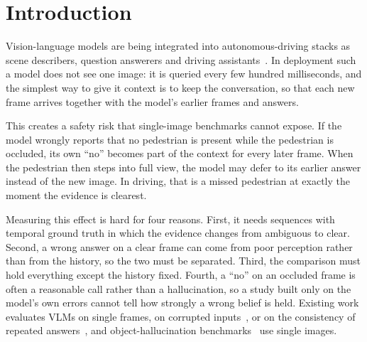 \documentclass[conference]{IEEEtran}
\begin{document}
\section{Introduction}

Vision-language models are being integrated into autonomous-driving stacks as scene describers, question answerers and driving assistants~\cite{guo2024vlmauto,xie2025drivebench,lin2025continual}. In deployment such a model does not see one image: it is queried every few hundred milliseconds, and the simplest way to give it context is to keep the conversation, so that each new frame arrives together with the model's earlier frames and answers.

This creates a safety risk that single-image benchmarks cannot expose. If the model wrongly reports that no pedestrian is present while the pedestrian is occluded, its own ``no'' becomes part of the context for every later frame. When the pedestrian then steps into full view, the model may defer to its earlier answer instead of the new image. In driving, that is a missed pedestrian at exactly the moment the evidence is clearest.

Measuring this effect is hard for four reasons. First, it needs sequences with temporal ground truth in which the evidence changes from ambiguous to clear. Second, a wrong answer on a clear frame can come from poor perception rather than from the history, so the two must be separated. Third, the comparison must hold everything except the history fixed. Fourth, a ``no'' on an occluded frame is often a reasonable call rather than a hallucination, so a study built only on the model's own errors cannot tell how strongly a wrong belief is held. Existing work evaluates VLMs on single frames, on corrupted inputs~\cite{xie2025drivebench}, or on the consistency of repeated answers~\cite{chang2026futurevqa}, and object-hallucination benchmarks~\cite{li2023pope,rohrbach2018chair} use single images.
\end{document}
